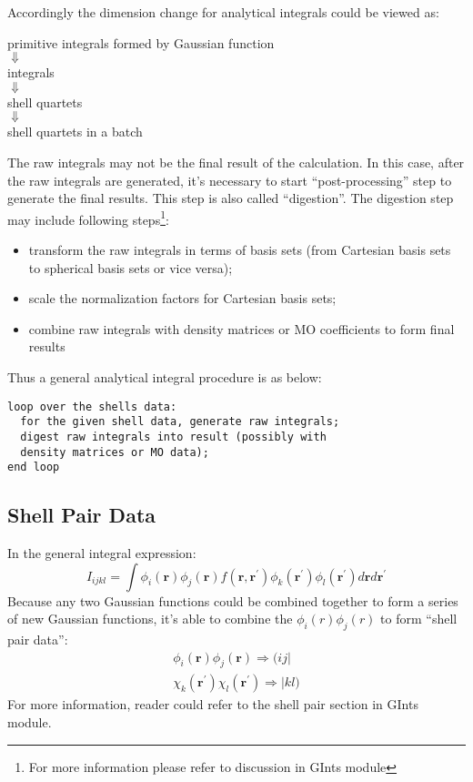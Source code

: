 Accordingly the dimension change for analytical integrals could be viewed
as:
\begin{center}
 primitive integrals formed by Gaussian function \\
 $\Downarrow$ \\
 integrals \\
 $\Downarrow$ \\
 shell quartets \\
 $\Downarrow$ \\
 shell quartets in a batch 
\end{center}

The raw integrals may not be the final result of the calculation. In this case,
after the raw integrals are generated, it's necessary to start ``post-processing''
step to generate the final results. This step is also called ``digestion''.
The digestion step may include following steps\footnote{For more information please
refer to discussion in GInts module}:
\begin{itemize}
 \item transform the raw integrals in terms of basis sets (from Cartesian basis
 sets to spherical basis sets or vice versa);
 \item scale the normalization factors for Cartesian basis sets;
 \item combine raw integrals with density matrices or MO coefficients to form
 final results
\end{itemize}
Thus a general analytical integral procedure is as below:
\begin{verbatim}
loop over the shells data:
  for the given shell data, generate raw integrals;
  digest raw integrals into result (possibly with
  density matrices or MO data);
end loop
\end{verbatim}

\subsection{Shell Pair Data}

In the general integral expression:
\begin{equation}
	I_{ijkl} = \int \phi_{i}(\bm{r})\phi_{j}(\bm{r})f(\bm{r},\bm{r^{'}})
	\phi_{k}(\bm{r^{'}})\phi_{l}(\bm{r^{'}}) d\bm{r} d\bm{r^{'}}
\end{equation}
Because any two Gaussian functions could be combined together to form a series of
new Gaussian functions, it's able to combine the $ \phi_{i}(r)\phi_{j}(r)$ to form 
``shell pair data'':
\begin{align}
	\label{shell_pair_eq:2}
	\phi_{i}(\bm{r})\phi_{j}(\bm{r}) \Longrightarrow (ij| \nonumber \\
	\chi_{k}(\bm{r^{'}})\chi_{l}(\bm{r^{'}}) \Longrightarrow |kl)
\end{align}
For more information, reader could refer to the shell pair section in GInts module.


